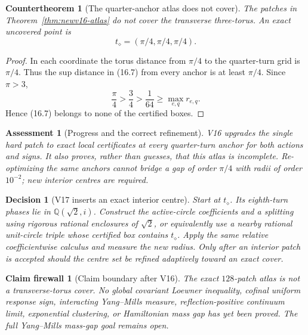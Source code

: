 \documentclass[11pt,oneside]{article}
\newtheorem{assessment}[theorem]{Assessment}
\newtheorem{firewall}[theorem]{Claim firewall}
\newtheorem{countertheorem}[theorem]{Countertheorem}
\newtheorem{decision}[theorem]{Decision}
\theoremstyle{definition}
\theoremstyle{remark}
\begin{document}
\begin{countertheorem}[The quarter-anchor atlas does not cover]
\label{ctr:newv16-no-cover}
The patches in Theorem~\ref{thm:newv16-atlas} do not cover the
transverse three-torus.  An exact uncovered point is
\[
 t_\diamond=(\pi/4,\pi/4,\pi/4).                          \tag{16.7}
\]
\end{countertheorem}

\begin{proof}
In each coordinate the torus distance from \(\pi/4\) to the
quarter-turn grid is \(\pi/4\).  Thus the sup distance in (16.7) from
every anchor is at least \(\pi/4\).  Since \(\pi>3\),
\[
 \frac{\pi}{4}>\frac34>\frac1{64}
 \ge\max_{e,q}r_{e,q}.                                   \tag{16.8}
\]
Hence (16.7) belongs to none of the certified boxes.
\end{proof}

\begin{assessment}[Progress and the correct refinement]
\label{ass:newv16}
V16 upgrades the single hard patch to exact local certificates at
every quarter-turn anchor for both actions and signs.  It also proves,
rather than guesses, that this atlas is incomplete.  Re-optimizing
the same anchors cannot bridge a gap of order \(\pi/4\) with radii of
order \(10^{-2}\); new interior centres are required.
\end{assessment}

\begin{decision}[V17 inserts an exact interior centre]
\label{dec:newv16-next}
Start at \(t_\diamond\).  Its eighth-turn phases lie in
\(\mathbb Q(\sqrt2,i)\).  Construct the active-circle coefficients
and a splitting using rigorous rational enclosures of \(\sqrt2\), or
equivalently use a nearby rational unit-circle triple whose certified
box contains \(t_\diamond\).  Apply the same relative coefficientwise
calculus and measure the new radius.  Only after an interior patch is
accepted should the centre set be refined adaptively toward an exact
cover.
\end{decision}

\begin{firewall}[Claim boundary after V16]
\label{fire:newv16-final}
The exact \(128\)-patch atlas is not a transverse-torus cover.  No
global covariant Loewner inequality, cofinal uniform response sign,
interacting Yang--Mills measure, reflection-positive continuum
limit, exponential clustering, or Hamiltonian mass gap has yet been
proved.  The full Yang--Mills mass-gap goal remains open.
\end{firewall}
\end{document}
